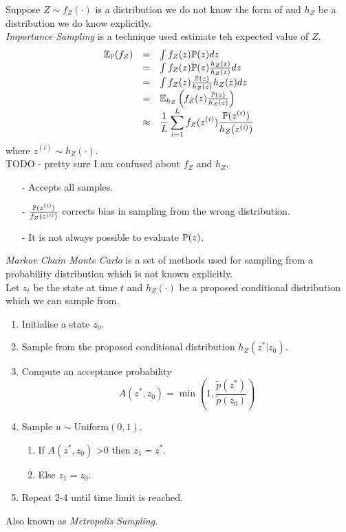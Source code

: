\documentclass[11pt,a4paper]{article}
\begin{document}
Suppose $Z\sim f_Z(\cdot)$ is a distribution we do not know the form of and $h_Z$ be a distribution we do know explicitly.\\
\textit{Importance Sampling} is a technique used estimate teh expected value of $Z$.
\[\begin{array}{rcl}
\mathbb{E}_{\mathbb{P}}(f_Z)&=&\int f_Z(z)\mathbb{P}(z)dz\\
&=&\int f_Z(z)\mathbb{P}(z)\frac{h_Z(z)}{h_Z(z)}dz\\
&=&\int f_Z(z)\frac{\mathbb{P}(z)}{h_Z(z)}h_Z(z)dz\\
&=&\mathbb{E}_{h_Z}\left(f_Z(z)\frac{\mathbb{P}(z)}{h_Z(z)}\right)\\
&\approx&{\displaystyle\frac{1}{L}\sum_{i=1}^Lf_Z(z^{(i)})\frac{\mathbb{P}(z^{(i)})}{h_Z(z^{(i)})}}\\
\end{array}\]
where $z^{(i)}\sim h_Z(\cdot)$.\\
TODO - pretty sure I am confused about $f_Z$ and $h_Z$.\\

\begin{itemize}
	\item[-] Accepts all samples.
	\item[-] $\frac{\mathbb{P}(z^{(i)})}{f_Z(z^{(i)})}$ corrects bias in sampling from the wrong distribution.
	\item[-] It is not always possible to evaluate $\mathbb{P}(z)$.
\end{itemize}

\textit{Markov Chain Monte Carlo} is a set of methods used for sampling from a probability distribution which is not known explicitly.\\
Let $z_t$ be the state at time $t$ and $h_Z(\cdot)$ be a proposed conditional distribution which we can sample from.
\begin{enumerate}
	\item Initialise a state $z_0$.
	\item Sample from the proposed conditional distribution $h_Z(z^*|z_0)$.
	\item Compute an acceptance probability
	$$A(z^*,z_0)=\min\left(1,\frac{\tilde{p}(z^*)}{\tilde{p}(z_0)}\right)$$
	\item Sample $u\sim\text{Uniform}(0,1)$.
	\begin{enumerate}
		\item If $A(z^*,z_0)$ >0 then $z_1=z^*$.
		\item Else $z_1=z_0$.
	\end{enumerate}
	\item Repeat 2-4 until time limit is reached.
\end{enumerate}
\nb Also known as \textit{Metropolis Sampling}.\\
\end{document}
